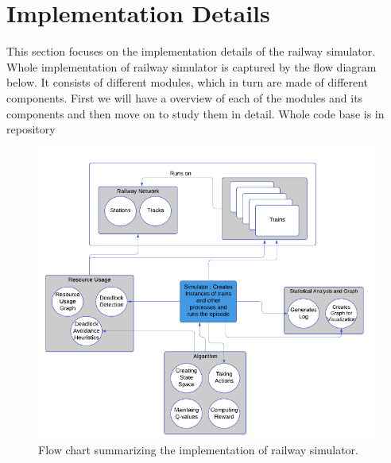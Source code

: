 \chapter{Implementation Details}

This section focuses on the implementation details of the railway simulator. Whole
implementation of railway simulator is captured by the flow diagram below. It consists of 
different modules, which in turn are made of different components. First we will have a overview of
each of the modules and its components and then move on to study them in detail. Whole code base is in 
repository \cite{WEBSITE:6}

\begin{figure}[h]
    \centering
    \includegraphics[width=1.0\textwidth]{Implementation}
    \caption{ Flow chart summarizing the implementation of railway simulator.  }
    \label{image-myimage1}
\end{figure}

\vspace{2cm}
